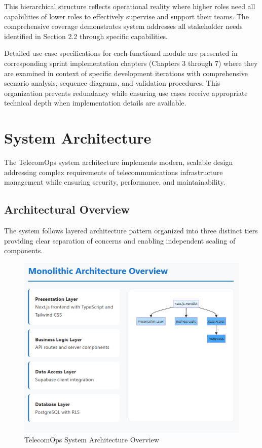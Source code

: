 This hierarchical structure reflects operational reality where higher roles need all capabilities of lower roles to effectively supervise and support their teams. The comprehensive coverage demonstrates system addresses all stakeholder needs identified in Section 2.2 through specific capabilities.

Detailed use case specifications for each functional module are presented in corresponding sprint implementation chapters (Chapters 3 through 7) where they are examined in context of specific development iterations with comprehensive scenario analysis, sequence diagrams, and validation procedures. This organization prevents redundancy while ensuring use cases receive appropriate technical depth when implementation details are available.

\section{System Architecture}

The TelecomOps system architecture implements modern, scalable design addressing complex requirements of telecommunications infrastructure management while ensuring security, performance, and maintainability.

\subsection{Architectural Overview}

The system follows layered architecture pattern organized into three distinct tiers providing clear separation of concerns and enabling independent scaling of components.

\begin{figure}[H]
    \centering
    \includegraphics[width=0.7\linewidth]{img/chap_02/architecture_overview.png}
    \caption{TelecomOps System Architecture Overview}
    \label{fig:architecture_overview}
\end{figure}

